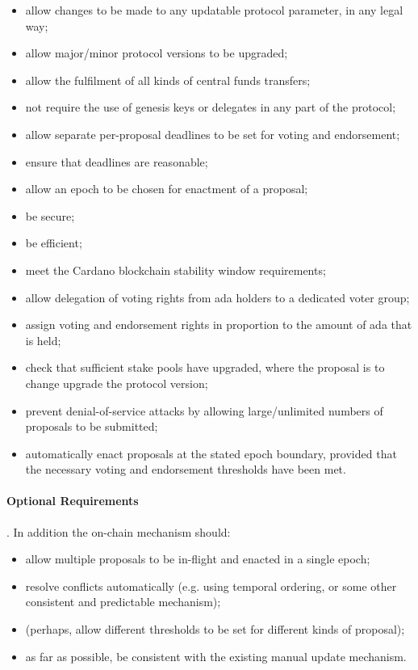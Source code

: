 \begin{itemize}
\item
  allow changes to be made to any updatable protocol parameter, in any legal way;
\item
  allow major/minor protocol versions to be upgraded;
\item
  allow the fulfilment of all kinds of central funds transfers;
\item
  not require the use of genesis keys or delegates in any part of the protocol;
\item
  allow separate per-proposal deadlines to be set for voting and endorsement;
\item
  ensure that deadlines are reasonable;
\item
  allow an epoch to be chosen for enactment of a proposal;
\item
  be secure;
\item
  be efficient;
\item
  meet the Cardano blockchain stability window requirements;
\item
  allow delegation of voting rights from ada holders to a dedicated voter group;
\item
  assign voting and endorsement rights in proportion to the amount of ada that is held;
\item
  check that sufficient stake pools have upgraded, where the proposal is to change upgrade the protocol version;
\item
  prevent denial-of-service attacks by allowing large/unlimited numbers of proposals to be submitted;
\item
  automatically enact proposals at the stated epoch boundary, provided that the necessary voting and endorsement thresholds have been met.
\end{itemize}

\paragraph{Optional Requirements}.  In addition the on-chain mechanism should:

\begin{itemize}
\item
  allow multiple proposals to be in-flight and enacted in a single epoch;
\item
  resolve conflicts automatically (e.g. using temporal ordering, or some other consistent and predictable mechanism);
\item
  (perhaps, allow different thresholds to be set for different kinds of proposal);
\item
  as far as possible, be consistent with the existing manual update mechanism.
\end{itemize}
